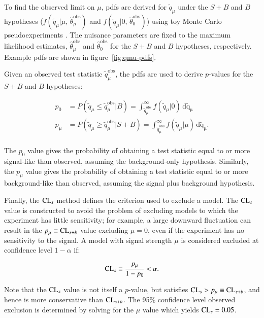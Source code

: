 \begin{appendices}
To find the observed limit on $\mu$, pdfs are derived for $\tilde{q}_{\mu}$ under the $S+B$ and $B$ hypotheses ($f(\tilde{q}_{\mu}|\mu,\,\hat{\theta}_{\mu}^{\mathrm{obs}})$ and $f(\tilde{q}_{\mu}|0,\,\hat{\theta}_{0}^{\mathrm{obs}})$) using toy Monte Carlo pseudoexperiments
. The nuisance parameters are fixed to the maximum likelihood estimates, $\hat{\theta}_{\mu}^{\mathrm{obs}}$ and $\hat{\theta}_{0}^{\mathrm{obs}}$ for the $S+B$ and $B$ hypotheses, respectively. Example pdfs are shown in figure~\ref{fig:qmu-pdfs}. 

Given an observed test statistic $\tilde{q}_{\mu}^{\mathrm{obs}}$, the pdfs are used to derive $p$-values for the $S+B$ and $B$ hypotheses:

\begin{align}\label{eqn:p-values}
	p_0 &= P(\tilde{q}_{\mu}\leq \tilde{q}_{\mu}^{\mathrm{obs}}|B)=  \int_{\tilde{q}_{\mu}^{\mathrm{obs}}}^{\infty} f(\tilde{q}_{\mu}|0)\,\mathrm{d\tilde{q}_{\mu}} \\
	p_{\mu} &= P(\tilde{q}_{\mu}\geq \tilde{q}_{\mu}^{\mathrm{obs}}|S+B) = \int_{\tilde{q}_{\mu}^{\mathrm{obs}}}^{\infty} f(\tilde{q}_{\mu}|\mu)\,\mathrm{d\tilde{q}_{\mu}}. \\
\end{align}

The $p_0$ value gives the probability of obtaining a test statistic equal to or more signal-like than observed, assuming the background-only hypothesis. Similarly, the $p_{\mu}$ value gives the probability of obtaining a test statistic equal to or more background-like than observed, assuming the signal plus background hypothesis. 

Finally, the $\mathrm{CL}_s$ method defines the criterion used to exclude a model. The $\mathrm{CL}_s$ value is constructed to avoid the problem of excluding models to which the experiment has little sensitivity; for example, a large downward fluctuation can result in the $p_{\mu}\equiv \mathrm{CL}_{s+b}$ value excluding $\mu=0$, even if the experiment has no sensitivity to the signal. A model with signal strength $\mu$ is considered excluded at confidence level $1-\alpha$ if:

\begin{equation}\label{eqn:cls}
	\mathrm{CL}_s \equiv \frac{p_{\mu}}{1-p_0} < \alpha.
\end{equation}

Note that the $\mathrm{CL}_s$ value is not itself a $p$-value, but satisfies $\mathrm{CL}_s > p_{\mu}\equiv \mathrm{CL}_{s+b}$, and hence is more conservative than $\mathrm{CL}_{s+b}$. The 95\% confidence level observed exclusion is determined by solving for the $\mu$ value which yields $\mathrm{CL}_s=0.05$.



\printbibliography

\end{appendices}

